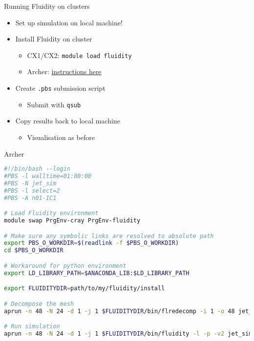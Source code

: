 \documentclass[t, hyperref={pdfpagelabels=false}]{beamer}
\begin{document}
\begin{frame}{Running Fluidity on clusters}
  \begin{itemize}
  \item Set up simulation on local machine!
    \vspace{1em}
  \item Install Fluidity on cluster
    \begin{itemize}
    \item CX1/CX2: \lstinline+module load fluidity+
    \item Archer: \href{https://github.com/FluidityProject/buildscripts/tree/master/uk/ac/archer}{instructions here}
    \end{itemize}
  \item Create \lstinline+.pbs+ submission script
    \begin{itemize}
    \item Submit with \lstinline+qsub+
    \end{itemize}
  \item Copy results back to local machine
    \begin{itemize}
    \item Visualisation as before
    \end{itemize}
  \end{itemize}
\end{frame}


\begin{frame}[fragile]{Archer}
  \begin{lstlisting}[language=bash, basicstyle=\tiny]
#!/bin/bash --login
#PBS -l walltime=01:00:00
#PBS -N jet_sim
#PBS -l select=2
#PBS -A n01-IC1

# Load Fluidity environment
module swap PrgEnv-cray PrgEnv-fluidity

# Make sure any symbolic links are resolved to absolute path
export PBS_O_WORKDIR=$(readlink -f $PBS_O_WORKDIR)
cd $PBS_O_WORKDIR

# Workaround for python environment
export LD_LIBRARY_PATH=$ANACONDA_LIB:$LD_LIBRARY_PATH

export FLUIDITYDIR=path/to/my/fluidity/install

# Decompose the mesh
aprun -n 48 -N 24 -d 1 -j 1 $FLUIDITYDIR/bin/flredecomp -i 1 -o 48 jet_sim set_sim_48

# Run simulation
aprun -n 48 -N 24 -d 1 -j 1 $FLUIDITYDIR/bin/fluidity -l -p -v2 jet_sim_48.flml
  \end{lstlisting}
\end{frame}
\end{document}

